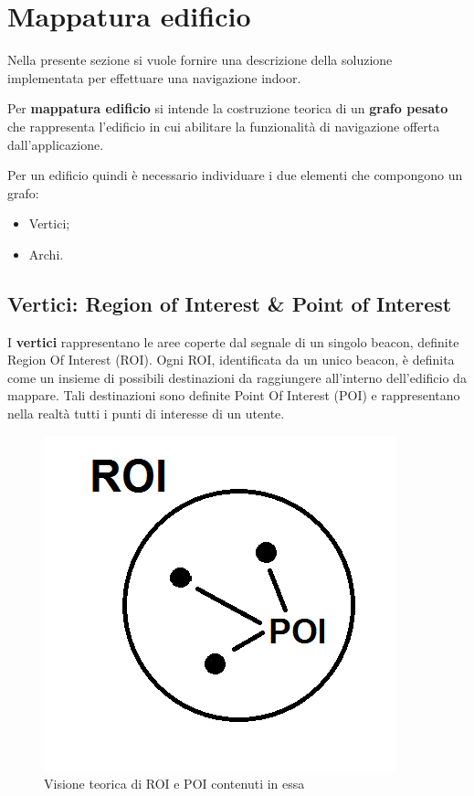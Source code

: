 \documentclass[../ManualeSviluppatore.tex]{subfiles}
\begin{document}
\section{Mappatura edificio}
	Nella presente sezione si vuole fornire una descrizione della soluzione implementata per effettuare una \gls{navigazione indoor}.
	
	Per \textbf{mappatura edificio} si intende la costruzione teorica di un \textbf{grafo pesato} che rappresenta l'edificio in cui abilitare la funzionalità di navigazione offerta dall'applicazione.
	
	Per un edificio quindi è necessario individuare i due elementi che compongono un grafo:
	\begin{itemize}
		\item Vertici;
		\item Archi.
	\end{itemize}
	
	\subsection{Vertici: Region of Interest \& Point of Interest}
	
	I \textbf{vertici} rappresentano le aree coperte dal segnale di un singolo \gls{beacon}, definite Region Of Interest (\gls{ROI}).
	Ogni ROI, identificata da un unico \gls{beacon}, è definita come un insieme di possibili destinazioni da raggiungere all'interno dell'edificio da mappare. Tali destinazioni sono definite Point Of Interest (\gls{POI}) e rappresentano nella realtà tutti i punti di interesse di un utente.
	
	\begin{figure} [h]
		\centering
		\includegraphics[scale=0.4]{img/ROIePOI}
		\caption{Visione teorica di ROI e POI contenuti in essa}
		\label{fig:ROIePOI}
	\end{figure}
	
\end{document}

